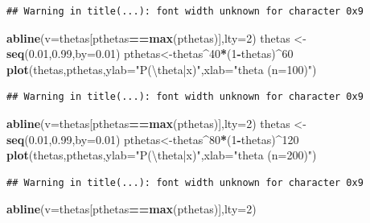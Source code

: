 \documentclass[
]{book}
\newenvironment{Shaded}{\begin{snugshade}}{\end{snugshade}}
\newcommand{\CharTok}[1]{\textcolor[rgb]{0.31,0.60,0.02}{#1}}
\newcommand{\DataTypeTok}[1]{\textcolor[rgb]{0.13,0.29,0.53}{#1}}
\newcommand{\DecValTok}[1]{\textcolor[rgb]{0.00,0.00,0.81}{#1}}
\newcommand{\FloatTok}[1]{\textcolor[rgb]{0.00,0.00,0.81}{#1}}
\newcommand{\KeywordTok}[1]{\textcolor[rgb]{0.13,0.29,0.53}{\textbf{#1}}}
\newcommand{\NormalTok}[1]{#1}
\newcommand{\OperatorTok}[1]{\textcolor[rgb]{0.81,0.36,0.00}{\textbf{#1}}}
\newcommand{\StringTok}[1]{\textcolor[rgb]{0.31,0.60,0.02}{#1}}
\begin{document}
\begin{verbatim}
## Warning in title(...): font width unknown for character 0x9
\end{verbatim}

\begin{Shaded}
\begin{Highlighting}[]
\KeywordTok{abline}\NormalTok{(}\DataTypeTok{v=}\NormalTok{thetas[pthetas}\OperatorTok{==}\KeywordTok{max}\NormalTok{(pthetas)],}\DataTypeTok{lty=}\DecValTok{2}\NormalTok{)}
\NormalTok{thetas <-}\StringTok{ }\KeywordTok{seq}\NormalTok{(}\FloatTok{0.01}\NormalTok{,}\FloatTok{0.99}\NormalTok{,}\DataTypeTok{by=}\FloatTok{0.01}\NormalTok{)}
\NormalTok{pthetas<-thetas}\OperatorTok{^}\DecValTok{40}\OperatorTok{*}\NormalTok{(}\DecValTok{1}\OperatorTok{-}\NormalTok{thetas)}\OperatorTok{^}\DecValTok{60}
\KeywordTok{plot}\NormalTok{(thetas,pthetas,}\DataTypeTok{ylab=}\StringTok{"P(}\CharTok{\textbackslash{}t}\StringTok{heta|x)"}\NormalTok{,}\DataTypeTok{xlab=}\StringTok{"theta  (n=100)"}\NormalTok{)}
\end{Highlighting}
\end{Shaded}

\begin{verbatim}
## Warning in title(...): font width unknown for character 0x9
\end{verbatim}

\begin{Shaded}
\begin{Highlighting}[]
\KeywordTok{abline}\NormalTok{(}\DataTypeTok{v=}\NormalTok{thetas[pthetas}\OperatorTok{==}\KeywordTok{max}\NormalTok{(pthetas)],}\DataTypeTok{lty=}\DecValTok{2}\NormalTok{)}
\NormalTok{thetas <-}\StringTok{ }\KeywordTok{seq}\NormalTok{(}\FloatTok{0.01}\NormalTok{,}\FloatTok{0.99}\NormalTok{,}\DataTypeTok{by=}\FloatTok{0.01}\NormalTok{)}
\NormalTok{pthetas<-thetas}\OperatorTok{^}\DecValTok{80}\OperatorTok{*}\NormalTok{(}\DecValTok{1}\OperatorTok{-}\NormalTok{thetas)}\OperatorTok{^}\DecValTok{120}
\KeywordTok{plot}\NormalTok{(thetas,pthetas,}\DataTypeTok{ylab=}\StringTok{"P(}\CharTok{\textbackslash{}t}\StringTok{heta|x)"}\NormalTok{,}\DataTypeTok{xlab=}\StringTok{"theta  (n=200)"}\NormalTok{)}
\end{Highlighting}
\end{Shaded}

\begin{verbatim}
## Warning in title(...): font width unknown for character 0x9
\end{verbatim}

\begin{Shaded}
\begin{Highlighting}[]
\KeywordTok{abline}\NormalTok{(}\DataTypeTok{v=}\NormalTok{thetas[pthetas}\OperatorTok{==}\KeywordTok{max}\NormalTok{(pthetas)],}\DataTypeTok{lty=}\DecValTok{2}\NormalTok{)}
\end{Highlighting}
\end{Shaded}
\end{document}
